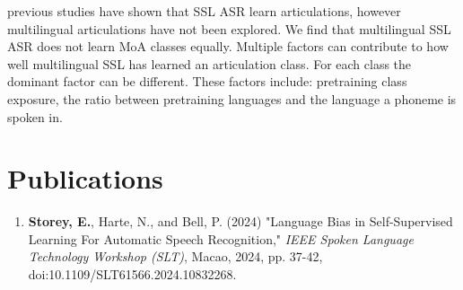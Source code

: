 \begin{enumerate}
    previous studies have shown that SSL ASR learn articulations, however multilingual articulations have not been explored. We find that multilingual SSL ASR does not learn MoA classes equally. Multiple factors can contribute to how well multilingual SSL has learned an articulation class. For each class the dominant factor can be different. These factors include: pretraining class exposure, the ratio between pretraining languages and the language a phoneme is spoken in. 
    
    

\end{enumerate}

\section{Publications}


\begin{enumerate}
    \item \textbf{Storey, E.}, Harte, N., and Bell, P. (2024) "Language Bias in Self-Supervised Learning For Automatic Speech Recognition," \textit{IEEE Spoken Language Technology Workshop (SLT)}, Macao, 2024, pp. 37-42, doi:10.1109/SLT61566.2024.10832268.
\end{enumerate}


